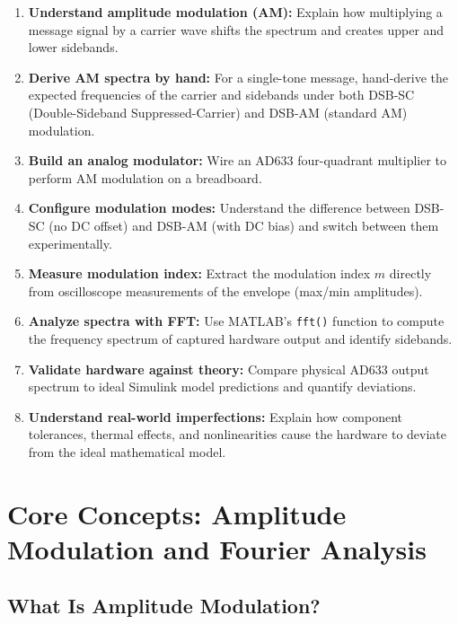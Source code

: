 \documentclass[11pt,letterpaper]{article}
\begin{document}
\begin{enumerate}
    \item \textbf{Understand amplitude modulation (AM):} Explain how multiplying a message signal by a carrier wave shifts the spectrum and creates upper and lower sidebands.

    \item \textbf{Derive AM spectra by hand:} For a single-tone message, hand-derive the expected frequencies of the carrier and sidebands under both DSB-SC (Double-Sideband Suppressed-Carrier) and DSB-AM (standard AM) modulation.

    \item \textbf{Build an analog modulator:} Wire an AD633 four-quadrant multiplier to perform AM modulation on a breadboard.

    \item \textbf{Configure modulation modes:} Understand the difference between DSB-SC (no DC offset) and DSB-AM (with DC bias) and switch between them experimentally.

    \item \textbf{Measure modulation index:} Extract the modulation index $m$ directly from oscilloscope measurements of the envelope (max/min amplitudes).

    \item \textbf{Analyze spectra with FFT:} Use MATLAB's \texttt{fft()} function to compute the frequency spectrum of captured hardware output and identify sidebands.

    \item \textbf{Validate hardware against theory:} Compare physical AD633 output spectrum to ideal Simulink model predictions and quantify deviations.

    \item \textbf{Understand real-world imperfections:} Explain how component tolerances, thermal effects, and nonlinearities cause the hardware to deviate from the ideal mathematical model.
\end{enumerate}

\clearpage

\section{Core Concepts: Amplitude Modulation and Fourier Analysis}

\subsection{What Is Amplitude Modulation?}
\end{document}
